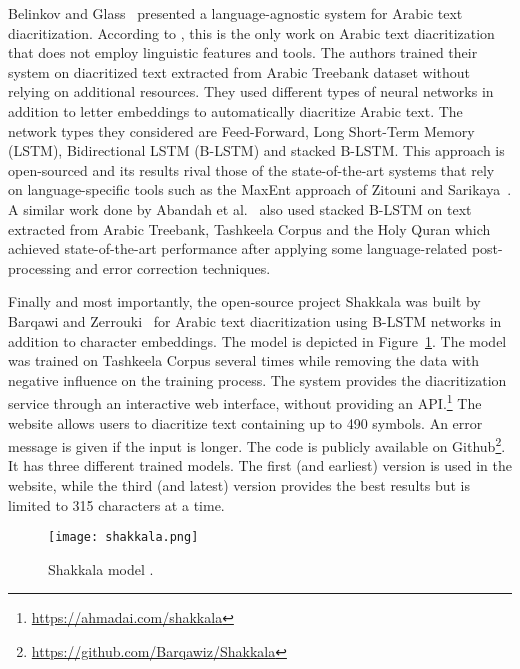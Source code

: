 \documentclass[conference]{IEEEtran}
\begin{document}
Belinkov and Glass~\cite{belinkov2015arabic} presented a language-agnostic system for Arabic text diacritization. According to \cite{darwish2017arabic}, this is the only work on Arabic text diacritization that does not employ linguistic features and tools. The authors trained their system on diacritized text extracted from Arabic Treebank dataset without relying on additional resources. They used different types of neural networks in addition to letter embeddings to automatically diacritize Arabic text. The network types they considered are Feed-Forward, Long Short-Term Memory (LSTM), Bidirectional LSTM (B-LSTM) and stacked B-LSTM.
This approach is open-sourced and its results rival those of the state-of-the-art systems that rely on language-specific tools such as the MaxEnt approach of Zitouni and Sarikaya~\cite{zitouni2009arabic}.
A similar work done by Abandah et al.~\cite{abandah2015automatic} also used stacked B-LSTM on text extracted from Arabic Treebank, Tashkeela Corpus and the Holy Quran which achieved state-of-the-art performance after applying some language-related post-processing and error correction techniques.










Finally and most importantly, the open-source project Shakkala was built by Barqawi and Zerrouki~\cite{shakkala} for Arabic text diacritization using B-LSTM networks in addition to character embeddings. The model is depicted in Figure~\ref{fig:shakkala}.
The model was trained on Tashkeela Corpus several times while removing the data with negative influence on the training process.
The system provides the diacritization service through an interactive web interface, without providing an API.\footnote{\url{https://ahmadai.com/shakkala}}
The website allows users to diacritize text containing up to 490 symbols. An error message is given if the input is longer.
The code is publicly available on Github\footnote{\url{https://github.com/Barqawiz/Shakkala}}. It has three different trained models. The first (and earliest) version is used in the website, while the third (and latest) version provides the best results but is limited to 315 characters at a time.

\begin{figure}[h]
    \centering
    \texttt{[image: shakkala.png]}
    \caption{Shakkala model \cite{shakkala}.}
\label{fig:shakkala}
\end{figure}
\end{document}
